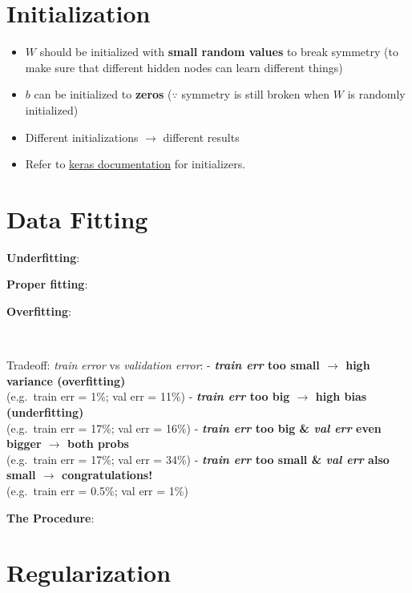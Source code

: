 \documentclass[
]{book}
\providecommand{\tightlist}{%
  \setlength{\itemsep}{0pt}\setlength{\parskip}{0pt}}
\begin{document}
\hypertarget{initialization}{%
\section{Initialization}\label{initialization}}

\begin{itemize}
\tightlist
\item
  \(W\) should be initialized with \textbf{small random values} to break
  symmetry (to make sure that different hidden nodes can learn different
  things)
\item
  \(b\) can be initialized to \textbf{zeros} (\(\because\) symmetry is
  still broken when \(W\) is randomly initialized)
\item
  Different initializations \(\rightarrow\) different results
\item
  Refer to \href{https://keras.io/initializers/}{keras documentation}
  for initializers.
\end{itemize}

\hypertarget{data-fitting}{%
\section{Data Fitting}\label{data-fitting}}

\textbf{Underfitting}:

\textbf{Proper fitting}:

\textbf{Overfitting}:

~

Tradeoff: \emph{train error} vs \emph{validation error}: -
\textbf{\emph{train err} too small \(\longrightarrow\) high variance
(overfitting)}\\
(e.g.~train err = 1\%; val err = 11\%) - \textbf{\emph{train err} too
big \(\longrightarrow\) high bias (underfitting)}\\
(e.g.~train err = 17\%; val err = 16\%) - \textbf{\emph{train err} too
big \& \emph{val err} even bigger \(\longrightarrow\) both probs}\\
(e.g.~train err = 17\%; val err = 34\%) - \textbf{\emph{train err} too
small \& \emph{val err} also small \(\longrightarrow\)
congratulations!}\\
(e.g.~train err = 0.5\%; val err = 1\%) ~\\
\hspace*{0.333em}

\textbf{The Procedure}:

\hypertarget{regularization}{%
\section{Regularization}\label{regularization}}
\end{document}

